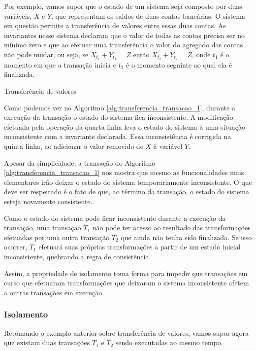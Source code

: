 \documentclass[11pt,twoside,a4paper]{book}
\begin{document}
Por exemplo, vamos supor que o estado de um sistema seja composto por duas variáveis, $X$ e $Y$, que representam os saldos de duas contas bancárias. O sistema em questão permite a transferência de valores entre essas duas contas. As invariantes nesse sistema declaram que o valor de todas as contas precisa ser no mínimo zero e que ao efetuar uma transferência o valor do agregado das contas não pode mudar, ou seja, se $X_{t_1} + Y_{t_1} = Z$ então $X_{t_2} + Y_{t_2} = Z$, onde $t_1$ é o momento em que a transação inicia e $t_2$ é o momento seguinte ao qual ela é finalizada.

\begin{algorithm}
\caption{Transferência de valores}
\label{alg:transferencia_transacao_1}
\end{algorithm}

Como podemos ver no Algoritmo \ref{alg:transferencia_transacao_1}, durante a execução da transação o estado do sistema fica inconsistente. A modificação efetuada pela operação da quarta linha leva o estado do sistema à uma situação inconsistente com a invariante declarada. Essa inconsistência é corrigida na quinta linha, ao adicionar o valor removido de $X$ à variável $Y$.

Apesar da simplicidade, a transação do Algoritmo \ref{alg:transferencia_transacao_1} nos mostra que mesmo as funcionalidades mais elementares irão deixar o estado do sistema temporariamente inconsistente. O que deve ser respeitado é o fato de que, ao término da transação, o estado do sistema esteja novamente consistente.

Como o estado do sistema pode ficar inconsistente durante a execução da transação, uma transação $T_1$ não pode ter acesso ao resultado das transformações efetuadas por uma outra transação $T_2$ que ainda não tenha sido finalizada. Se isso ocorrer, $T_1$ efetuará  suas próprias transformações a partir de um estado inicial inconsistente, quebrando a regra de consistência.

Assim, a propriedade de isolamento toma forma para impedir que transações em curso que efetuaram transformações que deixaram o sistema inconsistente afetem a outras transações em execução. 

\subsubsection*{Isolamento}
Retomando o exemplo anterior sobre transferência de valores, vamos supor agora que existam duas transações $T_1$ e $T_2$ sendo executadas ao mesmo tempo.
\end{document}
